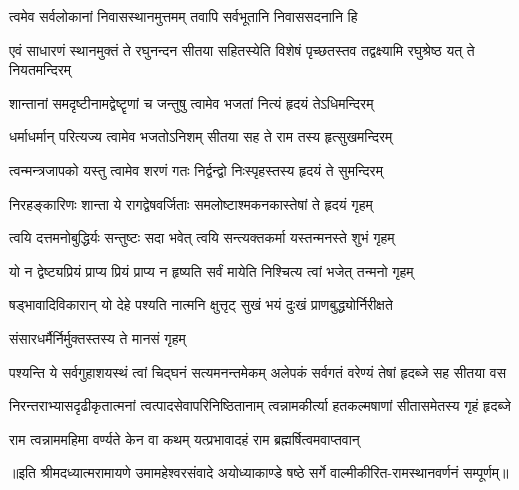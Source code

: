 
\addtocounter{shlokacount}{51}


\twolineshloka
{त्वमेव सर्वलोकानां निवासस्थानमुत्तमम्}
{तवापि सर्वभूतानि निवाससदनानि हि} %

\threelineshloka
{एवं साधारणं स्थानमुक्तं ते रघुनन्दन}
{सीतया सहितस्येति विशेषं पृच्छतस्तव}
{तद्वक्ष्यामि रघुश्रेष्ठ यत् ते नियतमन्दिरम्} %

\twolineshloka
{शान्तानां समदृष्टीनामद्वेष्टॄणां च जन्तुषु}
{त्वामेव भजतां नित्यं हृदयं तेऽधिमन्दिरम्} %

\twolineshloka
{धर्माधर्मान् परित्यज्य त्वामेव भजतोऽनिशम्}
{सीतया सह ते राम तस्य हृत्सुखमन्दिरम्} %

\twolineshloka
{त्वन्मन्त्रजापको यस्तु त्वामेव शरणं गतः}
{निर्द्वन्द्वो निःस्पृहस्तस्य हृदयं ते सुमन्दिरम्} %

\twolineshloka
{निरहङ्कारिणः शान्ता ये रागद्वेषवर्जिताः}
{समलोष्टाश्मकनकास्तेषां ते हृदयं गृहम्} %

\twolineshloka
{त्वयि दत्तमनोबुद्धिर्यः सन्तुष्टः सदा भवेत्}
{त्वयि सन्त्यक्तकर्मा यस्तन्मनस्ते शुभं गृहम्} %

\twolineshloka
{यो न द्वेष्ट्यप्रियं प्राप्य प्रियं प्राप्य न हृष्यति}
{सर्वं मायेति निश्चित्य त्वां भजेत् तन्मनो गृहम्} %

\twolineshloka
{षड्भावादिविकारान् यो देहे पश्यति नात्मनि}
{क्षुत्तृट् सुखं भयं दुःखं प्राणबुद्ध्योर्निरीक्षते} %

\onelineshloka
{संसारधर्मैर्निर्मुक्तस्तस्य ते मानसं गृहम्} %

\fourlineindentedshloka
{पश्यन्ति ये सर्वगुहाशयस्थं}
{त्वां चिद्घनं सत्यमनन्तमेकम्}
{अलेपकं सर्वगतं वरेण्यं}
{तेषां हृदब्जे सह सीतया वस} %

\fourlineindentedshloka
{निरन्तराभ्यासदृढीकृतात्मनां}
{त्वत्पादसेवापरिनिष्ठितानाम्}
{त्वन्नामकीर्त्या हतकल्मषाणां}
{सीतासमेतस्य गृहं हृदब्जे} %

\twolineshloka
{राम त्वन्नाममहिमा वर्ण्यते केन वा कथम्}
{यत्प्रभावादहं राम ब्रह्मर्षित्वमवाप्तवान्} %

{॥इति श्रीमदध्यात्मरामायणे उमामहेश्वरसंवादे
अयोध्याकाण्डे षष्ठे सर्गे  वाल्मीकीरित-रामस्थानवर्णनं  सम्पूर्णम्॥}

